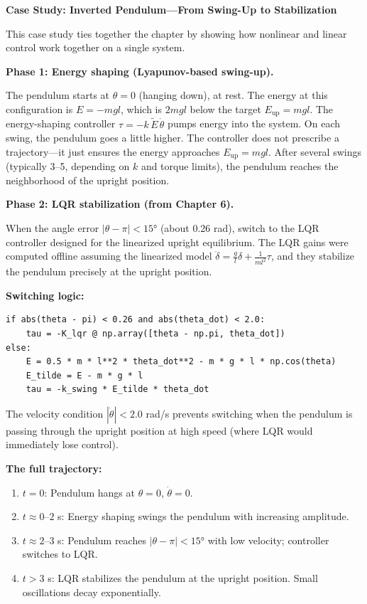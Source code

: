 
\begin{mdframed}[linewidth=1pt, innertopmargin=10pt, innerbottommargin=10pt]
\textbf{Case Study: Inverted Pendulum---From Swing-Up to Stabilization}

\vspace{0.5em}
This case study ties together the chapter by showing how nonlinear and linear control work together on a single system.

\textbf{Phase 1: Energy shaping (Lyapunov-based swing-up).}

The pendulum starts at $\theta = 0$ (hanging down), at rest. The energy at this configuration is $E = -mgl$, which is $2mgl$ below the target $E_{\text{up}} = mgl$. The energy-shaping controller $\tau = -k\,\tilde{E}\,\dot{\theta}$ pumps energy into the system. On each swing, the pendulum goes a little higher. The controller does not prescribe a trajectory---it just ensures the energy approaches $E_{\text{up}} = mgl$. After several swings (typically 3--5, depending on $k$ and torque limits), the pendulum reaches the neighborhood of the upright position.

\textbf{Phase 2: LQR stabilization (from Chapter 6).}

When the angle error $|\theta - \pi| < 15°$ (about 0.26 rad), switch to the LQR controller designed for the linearized upright equilibrium. The LQR gains were computed offline assuming the linearized model $\ddot{\delta} = \frac{g}{l}\delta + \frac{1}{ml^2}\tau$, and they stabilize the pendulum precisely at the upright position.

\textbf{Switching logic:}

\begin{verbatim}
if abs(theta - pi) < 0.26 and abs(theta_dot) < 2.0:
    tau = -K_lqr @ np.array([theta - np.pi, theta_dot])
else:
    E = 0.5 * m * l**2 * theta_dot**2 - m * g * l * np.cos(theta)
    E_tilde = E - m * g * l
    tau = -k_swing * E_tilde * theta_dot
\end{verbatim}

The velocity condition $|\dot{\theta}| < 2.0$ rad/s prevents switching when the pendulum is passing through the upright position at high speed (where LQR would immediately lose control).

\textbf{The full trajectory:}
\begin{enumerate}[nosep]
    \item $t = 0$: Pendulum hangs at $\theta = 0$, $\dot{\theta} = 0$.
    \item $t \approx 0$--$2$ s: Energy shaping swings the pendulum with increasing amplitude.
    \item $t \approx 2$--$3$ s: Pendulum reaches $|\theta - \pi| < 15°$ with low velocity; controller switches to LQR.
    \item $t > 3$ s: LQR stabilizes the pendulum at the upright position. Small oscillations decay exponentially.
\end{enumerate}


\end{mdframed}
